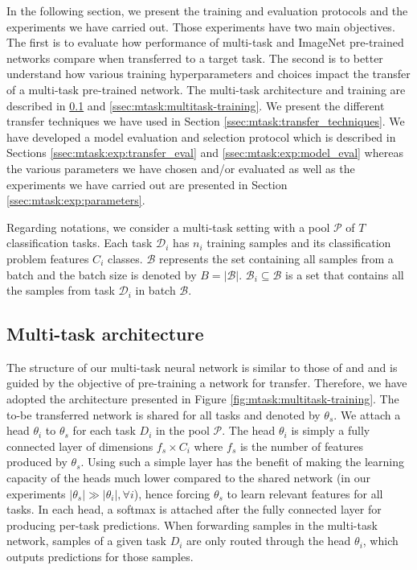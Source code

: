 In the following section, we present the training and evaluation protocols and the experiments we have carried out. Those experiments have two main objectives. The first is to evaluate how performance of multi-task and ImageNet pre-trained networks compare when transferred to a target task. The second is to better understand how various training hyperparameters and choices impact the transfer of a multi-task pre-trained network. The multi-task architecture and training are described in \ref{ssec:mtask:multitask-architecture} and \ref{ssec:mtask:multitask-training}. We present the different transfer techniques we have used in Section \ref{ssec:mtask:transfer_techniques}. We have developed a model evaluation and selection protocol which is described in Sections \ref{ssec:mtask:exp:transfer_eval} and \ref{ssec:mtask:exp:model_eval} whereas the various parameters we have chosen and/or evaluated as well as the experiments we have carried out are presented in Section \ref{ssec:mtask:exp:parameters}. 

Regarding notations, we consider a multi-task setting with a pool $\mathcal{P}$ of $T$ classification tasks. Each task $\mathcal{D}_i$ has $n_{i}$ training samples and its classification problem features $C_{i}$ classes. $\mathcal{B}$ represents the set containing all samples from a batch and the batch size is denoted by $B = \left|\mathcal{B}\right|$. $\mathcal{B}_{i} \subseteq \mathcal{B}$ is a set that contains all the samples from task $\mathcal{D}_i$ in batch $\mathcal{B}$. 

\subsection{Multi-task architecture}
\label{ssec:mtask:multitask-architecture}

The structure of our multi-task neural network is similar to those of \parencite{shang2019and} and \parencite{strezoski2019many} and is guided by the objective of pre-training a network for transfer. Therefore, we have adopted the architecture presented in Figure \ref{fig:mtask:multitask-training}. The to-be transferred network is shared for all tasks and denoted by $\theta_s$. We attach a head $\theta_i$ to $\theta_s$ for each task $D_i$ in the pool $\mathcal{P}$. The head $\theta_i$ is simply a fully connected layer of dimensions $f_s\times C_{i}$ where $f_s$ is the number of features produced by $\theta_s$. Using such a simple layer has the benefit of making the learning capacity of the heads much lower compared to the shared network (in our experiments $|\theta_s| \gg |\theta_i|, \forall i$), hence forcing $\theta_s$ to learn relevant features for all tasks. In each head, a softmax is attached after the fully connected layer for producing per-task predictions. When forwarding samples in the multi-task network, samples of a given task $D_i$ are only routed through the head $\theta_i$, which outputs predictions for those samples. 

